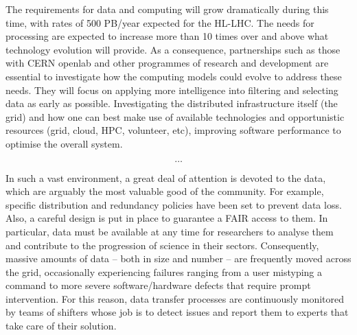 The requirements for data and computing will grow dramatically during this time, with rates of 500 PB/year expected for the HL-LHC. The needs for processing are expected to increase more than 10 times over and above what technology evolution will provide. As a consequence, partnerships such as those with CERN openlab and other programmes of research and development are essential to investigate how the computing models could evolve to address these needs. They will focus on applying more intelligence into filtering and selecting data as early as possible. Investigating the distributed infrastructure itself (the grid) and how one can best make use of available technologies and opportunistic resources (grid, cloud, HPC, volunteer, etc), improving software performance to optimise the overall system.








$$\dots$$

In such a vast environment, a great deal of attention is devoted to the data, which are arguably the most valuable good of the community.
For example, specific distribution and redundancy policies have been set to prevent data loss. Also, a careful design is put in place to guarantee a FAIR access to them.
In particular, data must be available at any time for researchers to analyse them and contribute to the progression of science in their sectors.
Consequently, massive amounts of data -- both in size and number -- are frequently moved across the grid, occasionally experiencing failures ranging from a user mistyping a command to more severe software/hardware defects that require prompt intervention. 
For this reason, data transfer processes are continuously monitored by teams of shifters whose job is to detect issues and report them to experts that take care of their solution.

